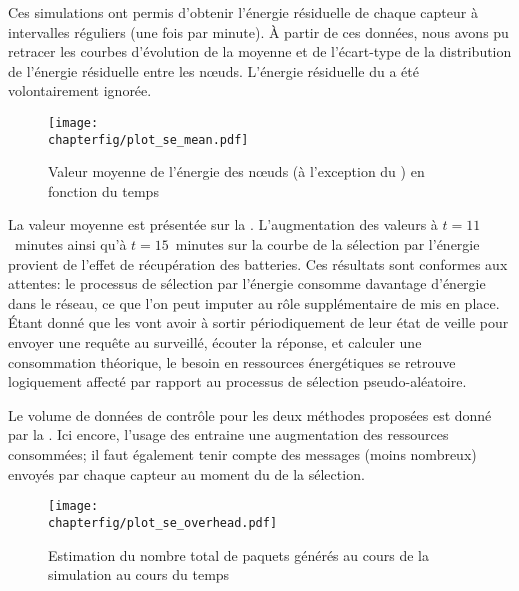 Ces simulations ont permis d'obtenir l'énergie résiduelle de chaque capteur à intervalles réguliers (une fois par minute).
À partir de ces données, nous avons pu retracer les courbes d'évolution de la moyenne et de l'écart-type de la distribution de l'énergie résiduelle entre les nœuds.
L'énergie résiduelle du \ch a été volontairement ignorée.
\begin{figure}[!b]
    \centering
    \texttt{[image: \\chapterfig/plot\_se\_mean.pdf]}
    \caption[Valeur moyenne de l'énergie des nœuds en fonction du temps]{Valeur moyenne de l'énergie des nœuds (à l'exception du \ch) en fonction du temps}\label{se:fig:mean}
\end{figure}
La valeur moyenne est présentée sur la .
L'augmentation des valeurs à $t=11$~minutes ainsi qu'à $t=15$~minutes sur la courbe de la sélection par l'énergie provient de l'effet de récupération des batteries.
Ces résultats sont conformes aux attentes: le processus de sélection par l'énergie consomme davantage d'énergie dans le réseau, ce que l'on peut imputer au rôle supplémentaire de \vn mis en place.
Étant donné que les \vns vont avoir à sortir périodiquement de leur état de veille pour envoyer une requête au \cn surveillé, écouter la réponse, et calculer une consommation théorique, le besoin en ressources énergétiques se retrouve logiquement affecté par rapport au processus de sélection pseudo-aléatoire.

Le volume de données de contrôle pour les deux méthodes proposées est donné par la .
Ici encore, l'usage des \vns entraine une augmentation des ressources consommées; il faut également tenir compte des messages (moins nombreux) envoyés par chaque capteur au moment du  de la sélection.
\begin{figure}[!ht]
    \centering
    \texttt{[image: \\chapterfig/plot\_se\_overhead.pdf]}
    \caption{Estimation du nombre total de paquets générés au cours de la simulation au cours du temps}\label{se:fig:overhead}
\end{figure}


